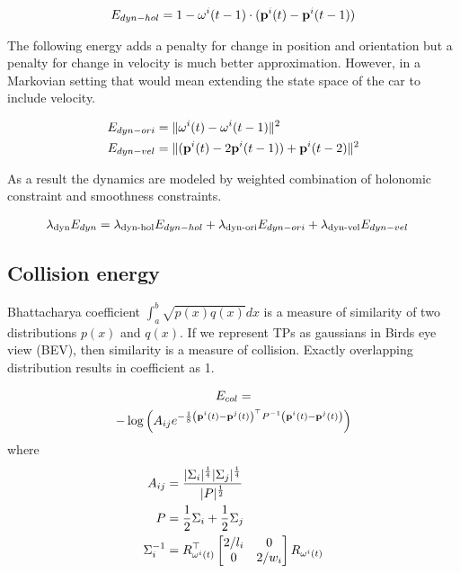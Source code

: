 \begin{align}
  \label{eq:totalPosTransitionEnergy}
  E_{dyn-hol} = 1 - \mathbf{\omega}^{i}(t-1) \cdot (\mathbf{p}^{i}({t}) - \mathbf{p}^{i}({t-1}))
\end{align}

The following energy adds a penalty for change in position and orientation
but a penalty for change in velocity is much better approximation. However, in
a Markovian setting that would mean extending the state space of the car to
include velocity.

\begin{align}
  E_{dyn-ori} &= \|\mathbf{\omega}^{i}(t) - \mathbf{\omega}^{i}(t-1)\|^2\\
  E_{dyn-vel} &= \|(\mathbf{p}^{i}({t}) - 2\mathbf{p}^{i}({t-1})) + \mathbf{p}^{i}({t-2})\|^2
\end{align}

As a result the dynamics are modeled by weighted combination of holonomic
constraint and smoothness constraints.

\begin{align}
  \lambda_{\text{dyn}}E_{dyn} &= \lambda_{\text{dyn-hol}}E_{dyn-hol} + \lambda_{\text{dyn-ori}}E_{dyn-ori} + \lambda_{\text{dyn-vel}}E_{dyn-vel}
\end{align}

 
\subsection{Collision energy}

Bhattacharya coefficient $\int_a^b\sqrt{p(x)q(x)}dx$ is a measure of similarity
of two distributions $p(x)$ and $q(x)$. If we represent TPs as gaussians in
Birds eye view (BEV), then similarity is a measure of collision. Exactly
overlapping distribution results in coefficient as 1. 

\begin{multline}
  \label{eq:collisionEnergyHellingerDistance}
  E_{col} =\\ -\log\left(
  A_{ij}
  e^{-\frac{1}{8}
    \left(\mathbf{p}^{i}({t}) - \mathbf{p}^{j}({t})\right)^\top
    P^{-1}
    \left(\mathbf{p}^{i}({t}) - \mathbf{p}^{j}({t})\right)
    }
    \right)
\end{multline}
where 
\begin{align}
  A_{ij} &= \frac{|\Sigma_i|^\frac{1}{4}|\Sigma_j|^\frac{1}{4}}
  {|P|^\frac{1}{2}}\\
  P &= \frac{1}{2}\Sigma_i + \frac{1}{2}\Sigma_j\\
\Sigma_i^{-1} &= R^\top_{\mathbf{\omega}^{i}(t)} \begin{bmatrix} 2/l_i & 0 \\ 0 & 2/w_i \end{bmatrix}
R_{\mathbf{\omega}^{i}(t)}
\end{align}


